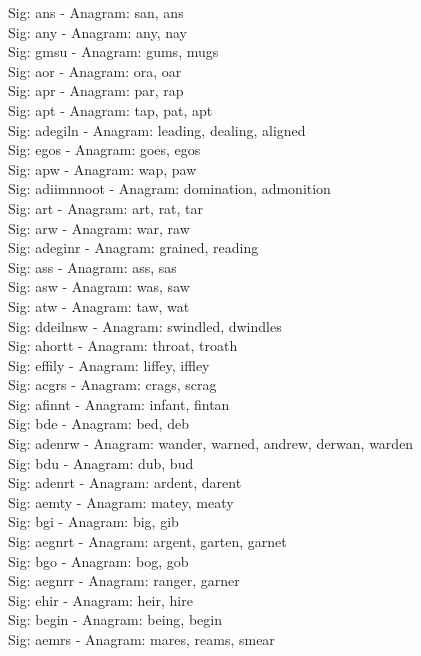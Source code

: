 Sig: {ans} - Anagram: san, ans \\
Sig: {any} - Anagram: any, nay \\
Sig: {gmsu} - Anagram: gums, mugs \\
Sig: {aor} - Anagram: ora, oar \\
Sig: {apr} - Anagram: par, rap \\
Sig: {apt} - Anagram: tap, pat, apt \\
Sig: {adegiln} - Anagram: leading, dealing, aligned \\
Sig: {egos} - Anagram: goes, egos \\
Sig: {apw} - Anagram: wap, paw \\
Sig: {adiimnnoot} - Anagram: domination, admonition \\
Sig: {art} - Anagram: art, rat, tar \\
Sig: {arw} - Anagram: war, raw \\
Sig: {adeginr} - Anagram: grained, reading \\
Sig: {ass} - Anagram: ass, sas \\
Sig: {asw} - Anagram: was, saw \\
Sig: {atw} - Anagram: taw, wat \\
Sig: {ddeilnsw} - Anagram: swindled, dwindles \\
Sig: {ahortt} - Anagram: throat, troath \\
Sig: {effily} - Anagram: liffey, iffley \\
Sig: {acgrs} - Anagram: crags, scrag \\
Sig: {afinnt} - Anagram: infant, fintan \\
Sig: {bde} - Anagram: bed, deb \\
Sig: {adenrw} - Anagram: wander, warned, andrew, derwan, warden \\
Sig: {bdu} - Anagram: dub, bud \\
Sig: {adenrt} - Anagram: ardent, darent \\
Sig: {aemty} - Anagram: matey, meaty \\
Sig: {bgi} - Anagram: big, gib \\
Sig: {aegnrt} - Anagram: argent, garten, garnet \\
Sig: {bgo} - Anagram: bog, gob \\
Sig: {aegnrr} - Anagram: ranger, garner \\
Sig: {ehir} - Anagram: heir, hire \\
Sig: {begin} - Anagram: being, begin \\
Sig: {aemrs} - Anagram: mares, reams, smear \\
